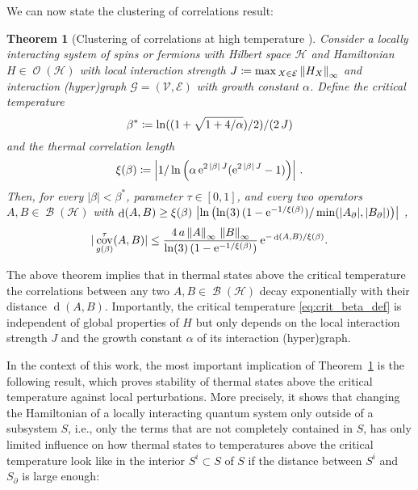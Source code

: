 \documentclass[a4paper,12pt,listof=totoc,index=totoc,bibliography=totoc,headsepline=false,headings=normal,BCOR16.153846mm,DIV12,headinclude,twoside,cleardoublepage=empty,numbers=noenddot,final]{scrreprt}
\theoremstyle{mystyle}
\numberwithin{equation}{section}
\numberwithin{figure}{section}
\numberwithin{lemma}{section}
\newtheorem{theorem}{Theorem}
\numberwithin{theorem}{section}
\numberwithin{corollary}{section}
\numberwithin{definition}{section}
\numberwithin{conjecture}{section}
\numberwithin{observation}{section}
\newcommand{\+}{\mkern2mu}
\newcommand{\coloneqq}{\mathrel{\vcentcolon\mkern-1.2mu=}} %
\renewcommand{\max}{\mathchoice{\operatorname*{max}}{\operatorname*{max}}{\mathrm{max}}{\mathrm{max}}} %
\renewcommand{\min}{\mathchoice{\operatorname*{min}}{\operatorname*{min}}{\mathrm{min}}{\mathrm{min}}}
\renewcommand{\H}{H}
\newcommand{\rhog}{g}
\newcommand{\animalc}{\alpha}
\newcommand{\Vset}{\mathcal{V}}
\newcommand{\Eset}{\mathcal{E}}
\newcommand{\norm}[2][]{
  \ifthenelse{\equal{#1}{}}
    {\left\| {#2} \right\|}
    {\ifthenelse{\equal{#1}{uinv}}
      {\left\vert\kern-0.25ex\left\vert\kern-0.25ex\left\vert {#2} \right\vert\kern-0.25ex\right\vert\kern-0.25ex\right\vert}
      {\left\| {#2} \right\|_{#1}}
    }
}
\newcommand{\e}{\mathrm{e}}
\DeclareMathOperator{\1}{\mathds{1}}
\DeclareMathOperator{\Bop}{\mathcal{B}}
\DeclareMathOperator{\Obs}{\mathcal{O}}
\DeclareMathOperator{\cov}{cov}
\DeclareMathOperator{\dist}{d}
\newcommand{\mc}[1]{\mathcal{#1}}
\newcommand{\mcH}{\mc{H}}
\newcommand{\mcG}{\mc{G}}
\begin{document}
We can now state the clustering of correlations result:
\begin{theorem}[Clustering of correlations at high temperature {\cite[Theorem~3 and 16]{Kliesch2013a}}] \label{thm:clustering}
  Consider a locally interacting system of spins or fermions with Hilbert space $\mcH$ and Hamiltonian $\H \in \Obs(\mcH)$ with \emph{local interaction strength} $J \coloneqq \max_{X\in\Eset} \norm[\infty]{\H_X}$ and interaction (hyper)graph $\mcG = (\Vset,\Eset)$ with growth constant $\animalc$.
  Define the \emph{critical temperature}
  \begin{equation}\label{eq:crit_beta_def}
    \beta^\ast \coloneqq \ln((1+\sqrt{1+4/\animalc})/2)/(2\,J)
  \end{equation}
  and the \emph{thermal correlation length}
  \begin{equation} \label{eq:correlation_length_def}
    \xi(\beta) \coloneqq \left|1/\ln\left(\animalc\, \e^{2\,|\beta|\,J}(\e^{2\,|\beta|\,J}-1)\right)\right|  \, .
  \end{equation}
  Then, for every $|\beta|<\beta^\ast$, parameter $\tau \in [0,1]$, and every two operators $A,B \in \Bop(\mcH)$ with
  $\dist(A, B) \geq \xi(\beta)\, \left|\ln\left(\ln(3)\, (1-\e^{-1/\xi(\beta)})/\min(|A_\partial |,|B_\partial |)\right)\right|$ ,
  \begin{equation} \label{eq:clustering}
    |\cov^\tau_{\rhog(\beta)} (A, B)| \leq \frac{4\,a \norm{A}_\infty\, \norm{B}_\infty}{\ln(3)\, (1-\e^{-1/\xi(\beta)})}\,\e^{-\dist(A,B)/\xi(\beta)} .
  \end{equation}
\end{theorem}

The above theorem implies that in thermal states above the critical temperature the correlations between any two $A,B \in \Bop(\mcH)$ decay exponentially with their distance $\dist(A,B)$.
Importantly, the critical temperature \eqref{eq:crit_beta_def} is independent of global properties of $\H$ but only depends on the local interaction strength $J$ and the growth constant $\animalc$ of its interaction (hyper)graph.

In the context of this work, the most important implication of Theorem~\ref{thm:clustering} is the following result, which proves stability of thermal states above the critical temperature against local perturbations.
More precisely, it shows that changing the Hamiltonian of a locally interacting quantum system only outside of a subsystem $S$, i.e., only the terms that are not completely contained in $S$, has only limited influence on how thermal states to temperatures above the critical temperature look like in the interior $S^i \subset S$ of $S$ if the distance between $S^i$ and $S_\partial$ is large enough:
\end{document}
